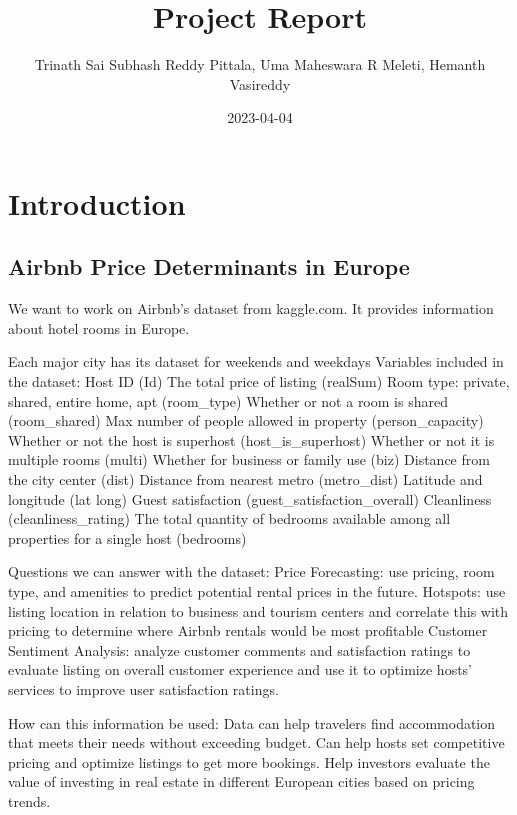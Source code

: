 \documentclass[
]{article}
\title{Project Report}
\author{Trinath Sai Subhash Reddy Pittala, Uma Maheswara R Meleti,
Hemanth Vasireddy}
\date{2023-04-04}
\begin{document}
\maketitle

\hypertarget{introduction}{%
\section{Introduction}\label{introduction}}

\hypertarget{airbnb-price-determinants-in-europe}{%
\subsection{Airbnb Price Determinants in
Europe}\label{airbnb-price-determinants-in-europe}}

We want to work on Airbnb's dataset from kaggle.com. It provides
information about hotel rooms in Europe.

Each major city has its dataset for weekends and weekdays Variables
included in the dataset: Host ID (Id) The total price of listing
(realSum) Room type: private, shared, entire home, apt (room\_type)
Whether or not a room is shared (room\_shared) Max number of people
allowed in property (person\_capacity) Whether or not the host is
superhost (host\_is\_superhost) Whether or not it is multiple rooms
(multi) Whether for business or family use (biz) Distance from the city
center (dist) Distance from nearest metro (metro\_dist) Latitude and
longitude (lat long) Guest satisfaction (guest\_satisfaction\_overall)
Cleanliness (cleanliness\_rating) The total quantity of bedrooms
available among all properties for a single host (bedrooms)

Questions we can answer with the dataset: Price Forecasting: use
pricing, room type, and amenities to predict potential rental prices in
the future. Hotspots: use listing location in relation to business and
tourism centers and correlate this with pricing to determine where
Airbnb rentals would be most profitable Customer Sentiment Analysis:
analyze customer comments and satisfaction ratings to evaluate listing
on overall customer experience and use it to optimize hosts' services to
improve user satisfaction ratings.

How can this information be used: Data can help travelers find
accommodation that meets their needs without exceeding budget. Can help
hosts set competitive pricing and optimize listings to get more
bookings. Help investors evaluate the value of investing in real estate
in different European cities based on pricing trends.
\end{document}
